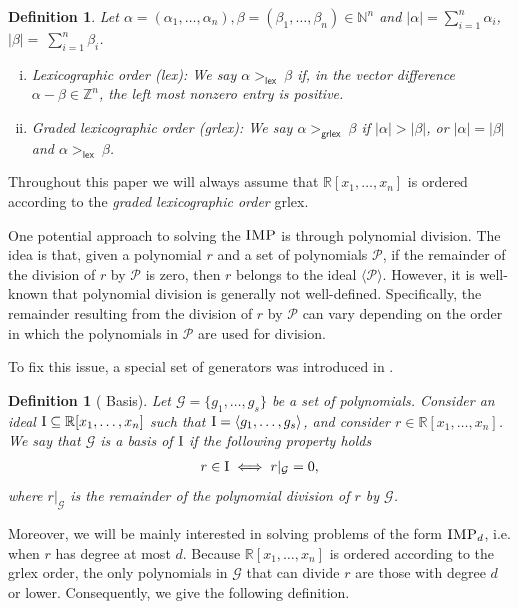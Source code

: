 \documentclass[11pt]{article}
\newcommand{\IMP}{\textsc{IMP}}
\newcommand{\lex}{\textsf{lex }}
\newcommand{\lexns}{\textsf{lex}}
\newcommand{\grlex}{\textsf{grlex }}
\newcommand{\grlexns}{\textsf{grlex}}
\newcommand{\I}{\emph{$\rm{I}$}}
\newcommand{\Zz}{\mathbb{Z}}
\newcommand{\1}{\textbf{1}}
\newcommand{\GB}{\text{Gr\"{o}bner} }
\newtheorem{definition}[theorem]{Definition}
\begin{document}
\begin{definition}\label{def:lex and grlex} Let $\alpha =(\alpha_1,\ldots,\alpha_n),\beta=(\beta_1,\ldots,\beta_n)\in \mathbb{N}^n$ and $|\alpha| = \sum_{i=1}^n\alpha_i$, $|\beta| = ~\sum_{i=1}^n\beta_i$.
  \begin{enumerate}[(i)]
      \item Lexicographic order (\lexns): We say $\alpha>_\lex \beta$ if, in the vector difference $\alpha -\beta \in \Zz^n$, the left most nonzero entry is positive. 
      \item Graded lexicographic order (\grlexns): We say $\alpha>_\grlex \beta$ if $|\alpha| >|\beta|$, or $|\alpha| =|\beta|$ and $\alpha>_\lex \beta$.
  \end{enumerate}
\end{definition}

Throughout this paper we will always assume that $\mathbb{R}[x_1,\ldots,x_n]$ is ordered according to the \textit{graded lexicographic order} \grlexns.

One potential approach to solving the $\IMP$ is through polynomial division. The idea is that, given a polynomial $r$ and a set of polynomials $\mathcal{P}$, if the remainder of the division of $r$ by $\mathcal{P}$ is zero, then $r$ belongs to the ideal $\langle \mathcal{P} \rangle$. However, it is well-known that polynomial division is generally not well-defined. Specifically, the remainder resulting from the division of $r$ by $\mathcal{P}$ can vary depending on the order in which the polynomials in $\mathcal{P}$ are used for division.

To fix this issue, a special set of generators was introduced in \cite{BuchbergerThesis}.
\begin{definition}[\GB Basis]
    Let $\mathcal{G} = \{g_1, \ldots, g_s\}$ be a set of polynomials. Consider an ideal $\I \subseteq \mathbb{R}[x_1, \ldots, x_n]$ such that $\I = \langle g_1, \ldots, g_s \rangle$, and consider $r \in \mathbb{R}[x_1, \ldots, x_n]$. We say that $\mathcal{G}$ is a \emph{\GB basis of $\I$} if the following property holds
    \begin{align*}
        r \in \I \iff r|_{\mathcal{G}} = 0,
    \end{align*}
where $r|_{\mathcal{G}}$ is the remainder of the polynomial division of $r$ by $\mathcal{G}$.
\end{definition}
%
Moreover, we will be mainly interested in solving problems of the form $\IMP_d$, i.e. when $r$ has degree at most $d$. Because $\mathbb{R}[x_1,\ldots,x_n]$ is ordered according to the \grlex order, the only polynomials in $\mathcal{G}$ that can divide $r$ are those with degree $d$ or lower. Consequently, we give the following definition.
\end{document}
